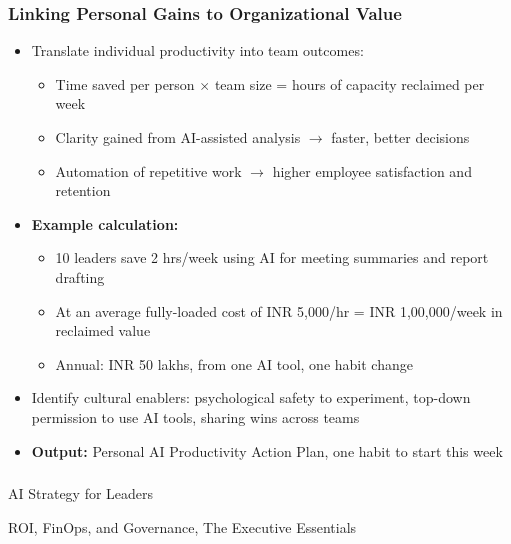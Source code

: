 \begin{frame}[fragile]\frametitle{Linking Personal Gains to Organizational Value}

\begin{itemize}
  \item Translate individual productivity into team outcomes:
    \begin{itemize}
      \item Time saved per person $\times$ team size = hours of capacity reclaimed per week
      \item Clarity gained from AI-assisted analysis $\rightarrow$ faster, better decisions
      \item Automation of repetitive work $\rightarrow$ higher employee satisfaction and retention
    \end{itemize}
  \item \textbf{Example calculation:}
    \begin{itemize}
      \item 10 leaders save 2 hrs/week using AI for meeting summaries and report drafting
      \item At an average fully-loaded cost of \textsf{\small INR 5,000/hr} = \textsf{\small INR 1,00,000/week} in reclaimed value
      \item Annual: \textsf{\small INR 50 lakhs}, from one AI tool, one habit change
    \end{itemize}
  \item Identify cultural enablers: psychological safety to experiment, top-down permission to use AI tools, sharing wins across teams
  \item \textbf{Output:} Personal AI Productivity Action Plan, one habit to start this week
\end{itemize}

\end{frame}


\begin{frame}[fragile]\frametitle{}
\begin{center}
{\Large AI Strategy for Leaders}

{\small ROI, FinOps, and Governance, The Executive Essentials}
\end{center}
\end{frame}

